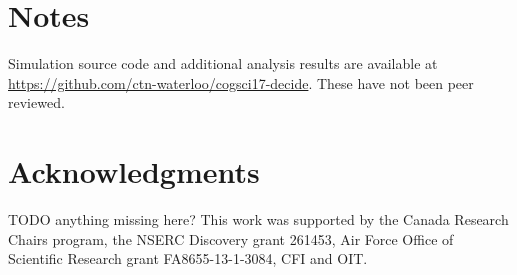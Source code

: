 \documentclass[10pt,letterpaper]{article}
\begin{document}
\section{Notes}
Simulation source code and additional analysis results are available at 
\url{https://github.com/ctn-waterloo/cogsci17-decide}.  These have not been peer 
reviewed.

\section{Acknowledgments}
TODO anything missing here?
This work was supported by the Canada Research Chairs program,
the NSERC Discovery grant 261453, Air Force Office of Scientific Research grant 
FA8655-13-1-3084, CFI and OIT\@.  %




\setlength{\bibleftmargin}{.125in}
\setlength{\bibindent}{-\bibleftmargin}


\end{document}
